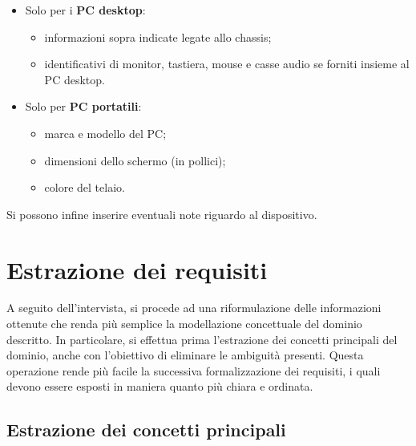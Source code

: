 \documentclass[a4paper,12pt]{report}
\begin{document}
\begin{itemize}
\begin{itemize}
		\end{itemize}
	\item Solo per i \textbf{PC desktop}:
		\begin{itemize}
			\item informazioni sopra indicate legate allo chassis;
			\item identificativi di monitor, tastiera, mouse e casse audio se forniti insieme al PC desktop.
		\end{itemize}
	\item Solo per \textbf{PC portatili}:
		\begin{itemize}
			\item marca e modello del PC;
			\item dimensioni dello schermo (in pollici);
			\item colore del telaio.
		\end{itemize}
\end{itemize}
\noindent Si possono infine inserire eventuali note riguardo al dispositivo.


\section{Estrazione dei requisiti}

A seguito dell'intervista, si procede ad una riformulazione delle informazioni ottenute che renda più semplice la modellazione concettuale del dominio descritto. In particolare, si effettua prima l'estrazione dei concetti principali del dominio, anche con l'obiettivo di eliminare le ambiguità presenti. Questa operazione rende più facile la successiva formalizzazione dei requisiti, i quali devono essere esposti in maniera quanto più chiara e ordinata.

\subsection{Estrazione dei concetti principali}
\end{document}
